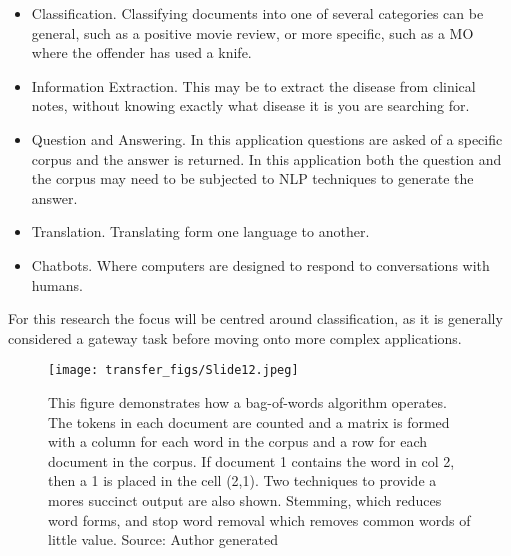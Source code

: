 \begin{itemize}

\item{Classification.} Classifying documents into one of several categories can be general, such as a positive movie review, or more specific, such as a MO where the offender has used a knife.

\item{Information Extraction.} This may be to extract the disease from clinical notes, without knowing exactly what disease it is you are searching for.

\item{Question and Answering.} In this application questions are asked of a specific corpus and the answer is returned. In this application both the question and the corpus may need to be subjected to NLP techniques to generate the answer.

\item{Translation.} Translating form one language to another.

\item{Chatbots.} Where computers are designed to respond to conversations with humans.

\end{itemize}

For this research the focus will be centred around classification, as it is generally considered a gateway task before moving onto more complex applications.


\begin{figure}
  \texttt{[image: transfer\_figs/Slide12.jpeg]}
  \caption[Bag-of-Words Example.]{This figure demonstrates how a bag-of-words algorithm operates. The tokens in each document are counted and a matrix is formed with a column for each word in the corpus and a row for each document in the corpus. If document 1 contains the word in col 2, then a 1 is placed in the cell (2,1). Two techniques to provide a mores succinct output are also shown. Stemming, which reduces word forms, and stop word removal which removes common words of little value. Source: Author generated}
  \label{fig:BOW}
\end{figure}

